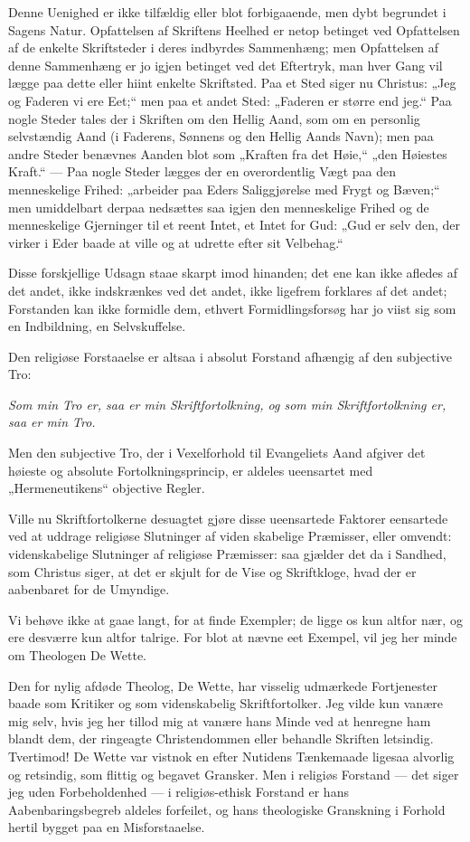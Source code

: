\documentclass[12pt,a4paper]{book}
\newcommand{\opage}[1]{\marginnote{\footnotesize\textit{[#1]}}}
\begin{document}
\opage{56} Denne Uenighed er ikke tilfældig eller blot forbigaaende, men dybt
begrundet i Sagens Natur. Opfattelsen af Skriftens Heelhed er netop
betinget ved Opfattelsen af de enkelte Skriftsteder i deres indbyrdes
Sammenhæng; men Opfattelsen af denne Sammenhæng er jo igjen betinget ved
det Eftertryk, man hver Gang vil lægge paa dette eller hiint enkelte
Skriftsted. Paa et Sted siger nu Christus: „Jeg og Faderen vi ere Eet;“
men paa et andet Sted: „Faderen er større end jeg.“ Paa nogle Steder
tales der i Skriften om den Hellig Aand, som om en personlig selvstændig
Aand (i Faderens, Sønnens og den Hellig Aands Navn); men paa andre Steder
benævnes Aanden blot som „Kraften fra det Høie,“ „den Høiestes Kraft.“
--- Paa nogle Steder lægges der en overordentlig Vægt paa den
menneskelige Frihed: „arbeider paa Eders Saliggjørelse med Frygt og
Bæven;“ men umiddelbart derpaa nedsættes saa igjen den menneskelige
Frihed og de menneskelige Gjerninger til et reent Intet, et Intet for
Gud: „Gud er selv den, der virker i Eder baade at ville og at udrette
efter sit Velbehag.“

Disse forskjellige Udsagn staae skarpt imod hinanden; det ene kan ikke
afledes af det andet, ikke indskrænkes ved det andet, ikke ligefrem
forklares af det andet; Forstanden kan ikke formidle dem, ethvert
Formidlingsforsøg har jo viist sig som en Indbildning, en Selvskuffelse.

Den religiøse Forstaaelse er altsaa i absolut Forstand afhængig af den
subjective Tro:

\emph{Som min Tro er, saa er min Skriftfortolkning, og som min
Skriftfortolkning er, saa er min Tro.}

Men den subjective Tro, der i Vexelforhold til Evangeliets Aand afgiver
det høieste og absolute Fortolkningsprincip, er aldeles ueensartet med
„Hermeneutikens“ objective Regler.

Ville nu Skriftfortolkerne desuagtet gjøre disse ueensartede Faktorer
eensartede ved at uddrage religiøse Slutninger af viden\-%
\opage{57}skabelige Præmisser, eller omvendt: videnskabelige Slutninger af
religiøse Præmisser: saa gjælder det da i Sandhed, som Christus siger, at
det er skjult for de Vise og Skriftkloge, hvad der er aabenbaret for de
Umyndige.

Vi behøve ikke at gaae langt, for at finde Exempler; de ligge os kun
altfor nær, og ere desværre kun altfor talrige. For blot at nævne eet
Exempel, vil jeg her minde om Theologen De Wette.

Den for nylig afdøde Theolog, De Wette, har visselig udmærkede
Fortjenester baade som Kritiker og som videnskabelig Skriftfortolker. Jeg
vilde kun vanære mig selv, hvis jeg her tillod mig at vanære hans Minde
ved at henregne ham blandt dem, der ringeagte Christendommen eller
behandle Skriften letsindig. Tvertimod! De Wette var vistnok en
efter Nutidens Tænkemaade ligesaa alvorlig og retsindig, som flittig og
begavet Gransker. Men i religiøs Forstand --- det siger jeg uden
Forbeholdenhed --- i religiøs-ethisk Forstand er hans Aabenbaringsbegreb
aldeles forfeilet, og hans theologiske Granskning i Forhold hertil bygget
paa en Misforstaaelse.
\end{document}
